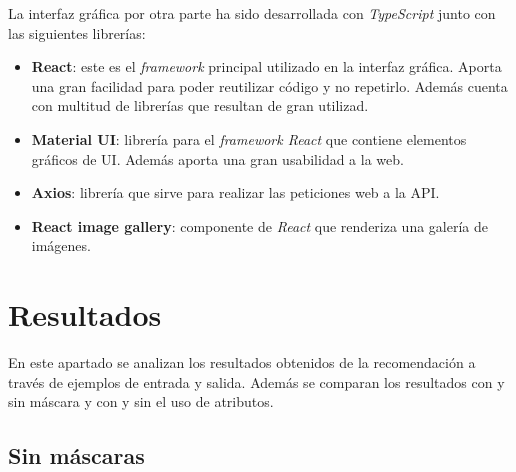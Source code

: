 \documentclass[12pt]{report} %
\begin{document}
	La interfaz gráfica por otra parte ha sido desarrollada con \textit{TypeScript} junto con las siguientes librerías:
	\begin{itemize}
		\item \textbf{React}: este es el \textit{framework} principal utilizado en la interfaz gráfica. Aporta una gran facilidad para
		poder reutilizar código y no repetirlo. Además cuenta con multitud de librerías que resultan de gran utilizad.
		\item \textbf{Material UI}: librería para el \textit{framework React} que contiene elementos gráficos de UI. Además aporta
		una gran usabilidad a la web. 
		\item \textbf{Axios}: librería que sirve para realizar las peticiones web a la API.
		\item \textbf{React image gallery}: componente de \textit{React} que renderiza una galería de imágenes.
	\end{itemize}

	\chapter{Resultados}

	En este apartado se analizan los resultados obtenidos de la recomendación a través de ejemplos de entrada
	y salida. Además se comparan los resultados con y sin máscara y con y sin el uso de atributos.


	\section{Sin máscaras}
\end{document}
